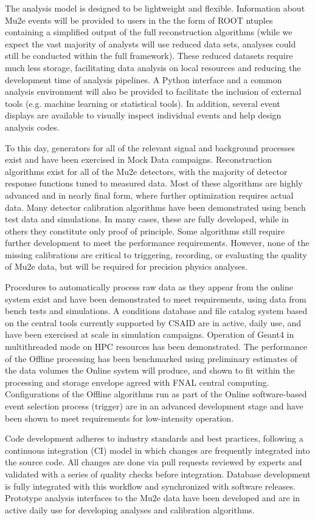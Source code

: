 The analysis model is designed to be lightweight and flexible. Information about Mu2e events will be provided to users in the the form of ROOT ntuples containing a simplified output of the full reconstruction algorithms (while we expect the vast majority of analysts will use reduced data sets, analyses could still be conducted within the full framework). These reduced datasets require much less storage, facilitating data analysis on local resources and reducing the development time of analysis pipelines. A Python interface and a common analysis environment will also be provided to facilitate the inclusion of external tools (e.g. machine learning or statistical tools). In addition, several event displays are available to visually inspect individual events and help design analysis codes.

To this day, generators for all of the relevant signal and background processes exist and have been exercised in Mock Data campaigns. Reconstruction algorithms exist for all of the Mu2e detectors, with the majority of detector response functions tuned to measured data. Most of these algorithms are highly advanced and in nearly final form, where further optimization requires actual data. Many detector calibration algorithms have been demonstrated using bench test data and simulations. In many cases, these are fully developed, while in others they constitute only proof of principle. Some algorithms still require further development to meet the performance requirements. However, none of the missing calibrations are critical to triggering, recording, or evaluating the quality of Mu2e data, but will be required for precision physics analyses. 

Procedures to automatically process raw data as they appear from the online system exist and have been demonstrated to meet requirements, using data from bench tests and simulations. A conditions database and file catalog system based on the central tools currently supported by CSAID are in active, daily use, and have been exercised at scale in simulation campaigns. Operation of Geant4 in multithreaded mode on HPC resources has been demonstrated. The performance of the Offline processing has been benchmarked using preliminary estimates of the data volumes the Online system will produce, and shown to fit within the processing and storage envelope agreed with FNAL central computing. Configurations of the Offline algorithms run as part of the Online software-based event selection process (trigger) are in an advanced development stage and have been shown to meet requirements for low-intensity operation. 

Code development adheres to industry standards and best practices, following a continuous integration (CI) model in which changes are frequently integrated into the source code. All changes are done via pull requests reviewed by experts and validated with a series of quality checks before integration. Database development is fully integrated with this workflow and synchronized with software releases. Prototype analysis interfaces to the Mu2e data have been developed and are in active daily use for developing analyses and calibration algorithms.